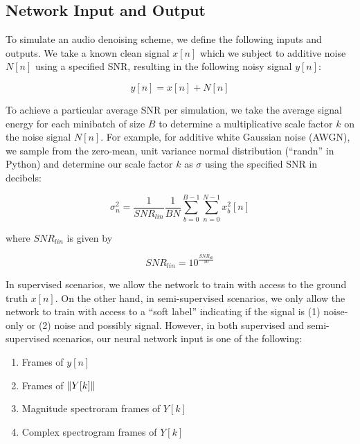 
\subsection{Network Input and Output}
To simulate an audio denoising scheme, we define the following inputs and outputs. We take a known clean signal $x[n]$ which we subject to additive noise $N[n]$ using a specified SNR, resulting in the following noisy signal $y[n]$:

\begin{equation}
y[n] = x[n] + N[n]
\end{equation}

To achieve a particular average SNR per simulation, we take the average signal energy for each minibatch of size $B$ to determine a multiplicative scale factor $k$ on the noise signal $N[n]$. For example, for additive white Gaussian noise (AWGN), we sample from the zero-mean, unit variance normal distribution (``randn'' in Python) and determine our scale factor $k$ as $\sigma$ using the specified SNR in decibels:

\begin{equation}\label{eq:siggy}
\sigma_n^{2} = \dfrac{1}{SNR_{lin}}\dfrac{1}{BN}\sum_{b=0}^{B-1} \sum_{n=0}^{N-1} x_{b}^{2}[n]
\end{equation}

where $SNR_{lin}$ is given by

\begin{equation}
SNR_{lin} = 10^{\frac{SNR_{db}}{10}}
\end{equation}

In supervised scenarios, we allow the network to train with access to the ground truth $x[n]$. On the other hand, in semi-supervised scenarios, we only allow the network to train with access to a ``soft label'' indicating if the signal is (1) noise-only or (2) noise and possibly signal. \cite{stow} However, in both supervised and semi-supervised scenarios, our neural network input is one of the following:

\begin{enumerate}
    \item Frames of $y[n]$
    \item Frames of $\lVert Y[k]\rVert$
    \item Magnitude spectroram frames of $Y[k]$
    \item Complex spectrogram frames of $Y[k]$
\end{enumerate}

